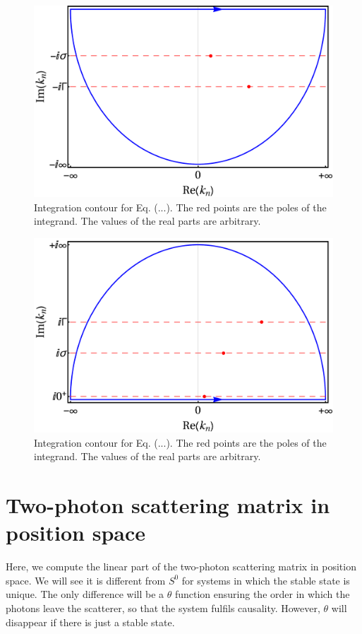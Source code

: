 \documentclass[aps,pra,reprint,amsmath,amssymb]{revtex4-1}
\begin{document}
\appendix

\begin{figure}
\includegraphics[scale=0.25]{lower_contour.pdf}
\caption{Integration contour for Eq. (...). The red points are the poles of the
integrand. The values of the real parts are arbitrary.}
\end{figure}

\begin{figure}
\includegraphics[scale=0.25]{upper_contour.pdf}
\caption{Integration contour for Eq. (...). The red points are the poles of the
integrand. The values of the real parts are arbitrary.}
\end{figure}


\section{Two-photon scattering matrix in position space}

Here, we compute the linear part of the two-photon scattering matrix in position space. We will see it is different from $S^0$ for systems in which the stable state is unique. The only difference will be a $\theta$ function ensuring the order in which the photons leave the scatterer, so that the system fulfils causality. However, $\theta$ will disappear if there is just a stable state. 



\end{document}
